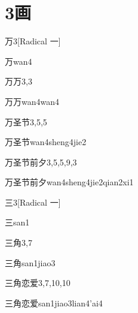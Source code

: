 
\section*{3画}

\begin{entry}{万}{3}[Radical 一]
  \begin{phonetics}{万}{wan4}
  \end{phonetics}
\end{entry}

\begin{entry}{万万}{3,3}
  \begin{phonetics}{万万}{wan4wan4}
  \end{phonetics}
\end{entry}

\begin{entry}{万圣节}{3,5,5}
  \begin{phonetics}{万圣节}{wan4sheng4jie2}
  \end{phonetics}
\end{entry}

\begin{entry}{万圣节前夕}{3,5,5,9,3}
  \begin{phonetics}{万圣节前夕}{wan4sheng4jie2qian2xi1}
  \end{phonetics}
\end{entry}

\begin{entry}{三}{3}[Radical 一]
  \begin{phonetics}{三}{san1}
  \end{phonetics}
\end{entry}

\begin{entry}{三角}{3,7}
  \begin{phonetics}{三角}{san1jiao3}
  \end{phonetics}
\end{entry}

\begin{entry}{三角恋爱}{3,7,10,10}
  \begin{phonetics}{三角恋爱}{san1jiao3lian4'ai4}
  \end{phonetics}
\end{entry}

